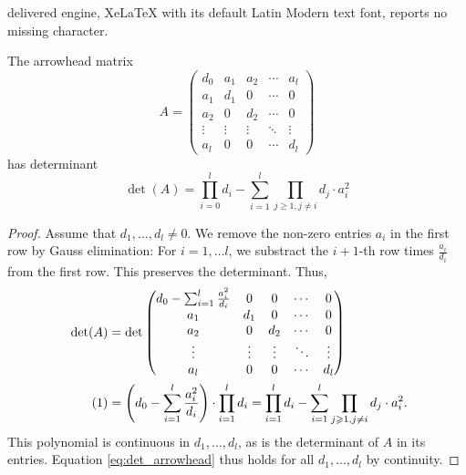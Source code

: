 \documentclass[10pt,a4paper]{amsart}
\let\geq\geqslant
\newcommand\numberthis{\addtocounter{equation}{1}\tag{\theequation}}
\begin{document}
delivered engine, XeLaTeX with its default Latin Modern text font, reports no missing character.
\begin{lemma}
    \label{lem:1}
    The arrowhead matrix
    $$
    A =
    \begin{pmatrix}
        d_0 & a_1 & a_2 & \cdots & a_l \\
        a_1 & d_1 & 0 & \cdots & 0 \\
        a_2 & 0 & d_2 & \cdots & 0 \\
        \vdots & \vdots & \vdots & \ddots & \vdots \\
        a_l & 0 & 0 & \cdots & d_l
    \end{pmatrix}
    $$
    has determinant
    $$
    \det(A) = \prod_{i = 0}^l d_i - \sum_{i = 1}^l \prod_{j \geq 1, j \neq i} d_j \cdot a_i^2
    $$
\end{lemma}

\begin{proof}
Assume that $d_1, \ldots, d_l \neq 0$.
We remove the non-zero entries $a_i$ in the first row by Gauss elimination: For $i = 1, \ldots l$, we substract the $i+1$-th row times $\frac{a_i}{d_i}$ from the first row.
This preserves the determinant.
Thus,
\begin{align*}
\det(A) &= \det \begin{pmatrix}
    d_0 - \sum_{i = 1}^l \frac{a_i^2}{d_i} & 0 & 0 & \cdots & 0 \\
    a_1 & d_1 & 0 & \cdots & 0 \\
    a_2 & 0 & d_2 & \cdots & 0 \\
    \vdots & \vdots & \vdots & \ddots & \vdots \\
    a_l & 0 & 0 & \cdots & d_l
\end{pmatrix} \\
\numberthis
\label{eq:det_arrowhead}
&= \left( d_0 - \sum_{i = 1}^l \frac{a_i^2}{d_i} \right) \cdot \prod_{i = 1}^l d_i = \prod_{i = 1}^l d_i - \sum_{i = 1}^l \prod_{j \geq 1, j \neq i} d_j \cdot a_i^2.
\end{align*}
This polynomial is continuous in $d_1, \ldots, d_l$, as is the determinant of $A$ in its entries.
Equation \eqref{eq:det_arrowhead} thus holds for all $d_1, \ldots, d_l$ by continuity.
\end{proof}
\end{document}
